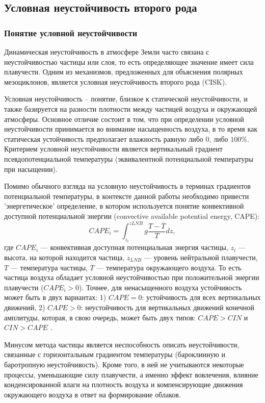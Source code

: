 \subsection{Условная неустойчивость второго рода}
\subsubsection{Понятие условной неустойчивости}
Динамическая неустойчивость в атмосфере Земли часто связана с неустойчивостью частицы или слоя, то есть определяющее значение имеет сила плавучести. Одним из механизмов, предложенных для объяснения полярных мезоциклонов, является условная неустойчивость второго рода (CISK). 

Условная неустойчивость – понятие, близкое к статической неустойчивости, и также базируется на разности плотности между частицей воздуха и окружающей атмосферы. Основное отличие состоит в том, что при определении условной неустойчивости принимается во внимание насыщенность воздуха, в то время как статическая устойчивость предполагает влажность равную либо $0$, либо $100\%$. Критерием условной неустойчивости является вертикальный градиент псевдопотенциальной температуры (эквивалентной потенциальной температуры при насыщении).

Помимо обычного взгляда на условную неустойчивость в терминах градиентов потенциальной температуры, в контексте данной работы необходимо привести 'энергетическое' определение, в котором используется понятие конвективной доступной потенциальной энергии (convective available potential energy, CAPE):
\begin{equation}
CAPE_i = \int_{z_{i}}^{z{LNB}} g\frac{T-\overline{T}}{T}dz,
\end{equation}
где $CAPE_i$ --- конвективная доступная потенциальная энергия частицы, $z_{i}$ --- высота, на которой находится частица, $z_{LNB}$ --- уровень нейтральной плавучести, $T$ --- температура частицы, $\overline{T}$ --- температура окружающего воздуха. То есть частица воздуха обладает условной неустойчивостью при положительной энергии плавучести ($CAPE_i>0$). Точнее, для ненасыщенного воздуха устойчивость может быть в двух вариантах: 1) $CAPE=0$: устойчивость для всех вертикальных движений, 2) $CAPE>0$: неустойчивость для вертикальных движений конечной амплитуды, которая, в свою очередь, может быть двух типов: $CAPE>CIN$ и $CIN>CAPE$ \citep{Lin2007}.

Минусом метода частицы является неспособность описать неустойчивости, связанные с горизонтальным градиентом температуры (бароклинную и баротропную неустойчивость). Кроме того, в ней не учитываются некоторые процессы, уменьшающие силу плавучести, а именно эффект вовлечения, влияние конденсированной влаги на плотность воздуха и компенсирующие движения окружающего воздуха в ответ на формирование облаков.

